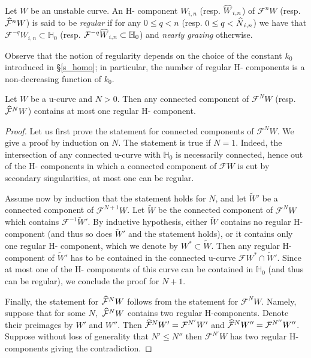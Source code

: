 \documentclass[AHL, Unicode, longabstracts,published]{cedram}
\newcommand{\inv}{^{-1}}
\newcommand{\homo}{\mathbb{H}}
\newcommand{\cm}{\mathcal{F}}
\newcommand{\cmp}{\hat\cm}
\newcommand{\Hcomp}{H-\hskip0pt component}
\newcommand{\Hcomps}{H-\hskip0pt components}
\newcommand{\Np}{\hat N}
\let\oldhat\hat
\renewcommand*{\hat}[1]{\mathchoice{\widehat{#1}}{\widehat{#1}}{\oldhat{#1}}{\oldhat{#1}}}
\begin{document}
\begin{defi}
Let $W$ be an unstable curve. An \Hcomp{} $W_{i,n}$ (resp. $\hat W_{i,n}$) of $\cm^n W$ (resp. $\cmp^n W$) is said to be
\emph{regular} if for any $0 \le q < n$ (resp. $0\le q < \Np_{i,n}$) we have that $\cm^{-q}W_{i,n}\subset \homo_0$ (resp. $\cm^{-q}\hat W_{i,n}\subset \homo_0$) and \emph{nearly grazing} otherwise.
\end{defi}

Observe that the notion of regularity depends on the choice of the constant $k_0$ introduced in \S\ref{s_homo}; in particular, the number of regular \Hcomps{} is a non-decreasing function of $k_{0}$.
\begin{lemm}\label{l_atMostOne1}
Let $W$ be a u-curve and $N > 0$. Then any connected component of $\cm^NW$ (resp. $\cmp^NW$) contains at most one regular \Hcomp{}.
\end{lemm}
\begin{proof}
Let us first prove the statement for connected components of $\cm^NW.$ We give a proof by induction on $N$. The statement is true if $N = 1$. Indeed, the intersection of any connected u-curve with $\homo_0$ is necessarily connected, hence out of the \Hcomps{} in which a connected component of $\cm W$ is cut by secondary singularities, at most one can be regular.

Assume now by induction that the statement holds for $N$, and let $\widetilde W'$ be a connected component of $\cm^{N+1}W$. Let $\widetilde W$ be the connected component of $\cm^N W$ which contains $\cm\inv \widetilde W'$. By inductive hypothesis, either $\widetilde W$ contains no regular \Hcomp{} (and thus so does $\widetilde W'$ and the statement holds), or it contains only one regular \Hcomp{}, which we denote by $W^*\subset\widetilde W$. Then any regular \Hcomp{} of $\widetilde W'$ has to be contained in the connected u-curve $\cm W^*\cap \widetilde W'$. Since at most one of the \Hcomps{} of this curve can be contained in $\homo_0$ (and thus can be regular), we conclude the proof for $N+1$.

Finally, the statement for $\cmp^NW$ follows from the statement for $\cm^NW$. Namely, suppose that for some $N,$ $\cmp^N W$ contains two regular H-components. Denote their preimages by $W'$ and $W''$. Then $\cmp^N W'=\cm^{N'} W'$ and $\cmp^N W''=\cm^{N''} W''$. Suppose without loss of generality that $N'\leq N''$ then $\cm^{N'} W$ has two regular H-components giving the contradiction.
\end{proof}
\end{document}
